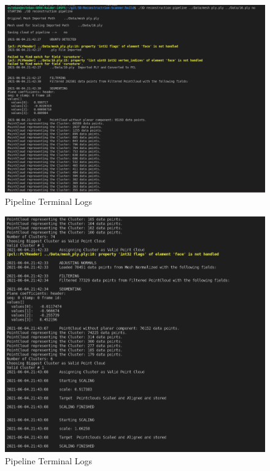 \documentclass[12pt]{report}
\begin{document}
\begin{figure}[H]%
  \centering
  \includegraphics[width=1\textwidth]{log1.png}
\caption{Pipeline Terminal Logs}
\label{fig:log1}
\end{figure}

\begin{figure}[H]%
  \centering
  \includegraphics[width=1\textwidth]{log2.png}
\caption{Pipeline Terminal Logs}
\label{fig:log2}
\end{figure}
\end{document}
